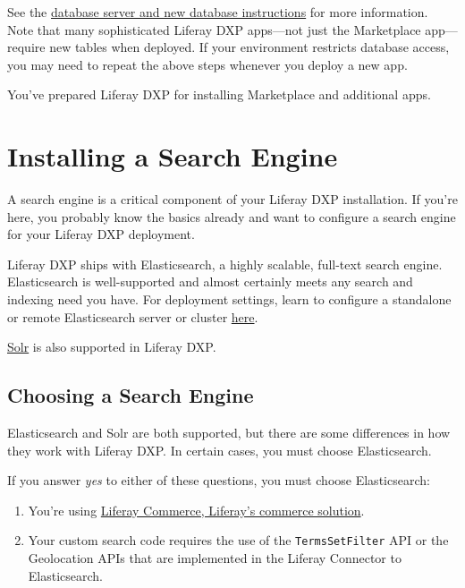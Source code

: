 See the
\href{/docs/7-1/deploy/-/knowledge_base/d/preparing-for-install\#step-1-choose-a-database-server-and-create-a-new-database}{database
server and new database instructions} for more information. Note that
many sophisticated Liferay DXP apps---not just the Marketplace
app---require new tables when deployed. If your environment restricts
database access, you may need to repeat the above steps whenever you
deploy a new app.

You've prepared Liferay DXP for installing Marketplace and additional
apps.

\chapter{Installing a Search Engine}\label{installing-a-search-engine}

A search engine is a critical component of your Liferay DXP
installation. If you're here, you probably know the basics already and
want to configure a search engine for your Liferay DXP deployment.

Liferay DXP ships with Elasticsearch, a highly scalable, full-text
search engine. Elasticsearch is well-supported and almost certainly
meets any search and indexing need you have. For deployment settings,
learn to configure a standalone or remote Elasticsearch server or
cluster
\href{/docs/7-1/deploy/-/knowledge_base/d/installing-elasticsearch}{here}.

\href{http://lucene.apache.org/solr}{Solr} is also supported in Liferay
DXP.

\section{Choosing a Search Engine}\label{choosing-a-search-engine}

Elasticsearch and Solr are both supported, but there are some
differences in how they work with Liferay DXP. In certain cases, you
must choose Elasticsearch.

If you answer \emph{yes} to either of these questions, you must choose
Elasticsearch:

\begin{enumerate}
\def\labelenumi{\arabic{enumi}.}
\item
  You're using
  \href{/web/commerce/documentation/-/knowledge_base/1-0/getting-started}{Liferay
  Commerce, Liferay's commerce solution}.
\item
  Your custom search code requires the use of the
  \texttt{TermsSetFilter} API or the Geolocation APIs that are
  implemented in the Liferay Connector to Elasticsearch.
\end{enumerate}


